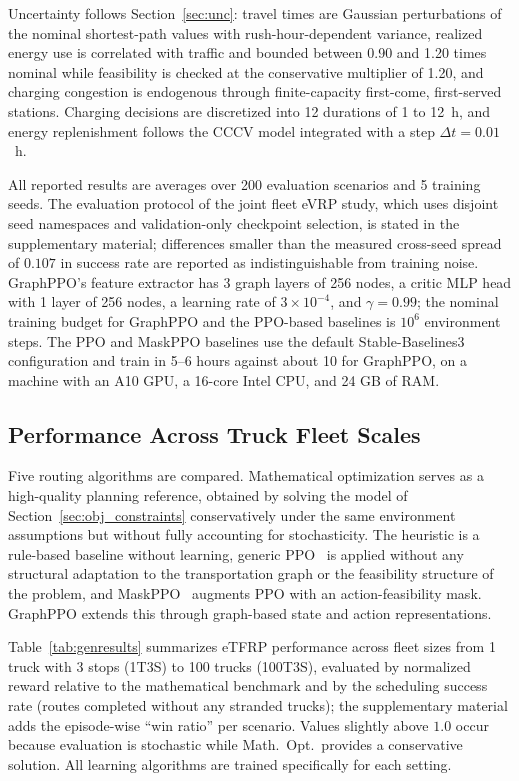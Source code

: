 \documentclass[journal]{IEEEtran}
\begin{document}
Uncertainty follows Section~\ref{sec:unc}: travel times are Gaussian perturbations of the nominal shortest-path values with rush-hour-dependent variance, realized energy use is correlated with traffic and bounded between 0.90 and 1.20 times nominal while feasibility is checked at the conservative multiplier of 1.20, and charging congestion is endogenous through finite-capacity first-come, first-served stations. Charging decisions are discretized into 12 durations of 1 to 12~h, and energy replenishment follows the CCCV model integrated with a step $\Delta t = 0.01$~h. 

All reported results are averages over 200 evaluation scenarios and 5 training seeds. The evaluation protocol of the joint fleet eVRP study, which uses disjoint seed namespaces and validation-only checkpoint selection, is stated in the supplementary material; differences smaller than the measured cross-seed spread of $0.107$ in success rate are reported as indistinguishable from training noise. GraphPPO's feature extractor has 3 graph layers of 256 nodes, a critic MLP head with 1 layer of 256 nodes, a learning rate of $3\times10^{-4}$, and $\gamma = 0.99$; the nominal training budget for GraphPPO and the PPO-based baselines is $10^6$ environment steps. The PPO and MaskPPO baselines use the default Stable-Baselines3~\cite{sb3} configuration and train in 5--6 hours against about 10 for GraphPPO, on a machine with an A10 GPU, a 16-core Intel CPU, and 24 GB of RAM. 


\subsection{Performance Across Truck Fleet Scales}

Five routing algorithms are compared. Mathematical optimization serves as a high-quality planning reference, obtained by solving the model of Section~\ref{sec:obj_constraints} conservatively under the same environment assumptions but without fully accounting for stochasticity.
The heuristic is a rule-based baseline without learning, generic PPO~\cite{ppo} is applied without any structural adaptation to the transportation graph or the feasibility structure of the problem, and MaskPPO~\cite{maskppo} augments PPO with an action-feasibility mask. GraphPPO extends this through graph-based state and action representations.

Table~\ref{tab:genresults} summarizes eTFRP performance across fleet sizes from 1 truck with 3 stops (1T3S) to 100 trucks (100T3S), evaluated by normalized reward relative to the mathematical benchmark and by the scheduling success rate (routes completed without any stranded trucks); the supplementary material adds the episode-wise ``win ratio'' per scenario. Values slightly above $1.0$ occur because evaluation is stochastic while Math.\ Opt.\ provides a conservative solution. All learning algorithms are trained specifically for each setting.
\end{document}
